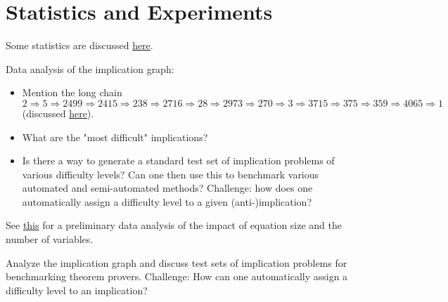 \section{Statistics and Experiments}


Some statistics are discussed \href{https://leanprover.zulipchat.com/#narrow/channel/458659-Equational/topic/A.20final.20end-to-end.20theorem.20in.20Lean}{here}.

Data analysis of the implication graph:

\begin{itemize}
    \item Mention the long chain $2 \Rightarrow 5 \Rightarrow 2499 \Rightarrow 2415 \Rightarrow 238 \Rightarrow 2716 \Rightarrow 28 \Rightarrow 2973 \Rightarrow 270 \Rightarrow 3 \Rightarrow 3715 \Rightarrow 375 \Rightarrow 359 \Rightarrow 4065 \Rightarrow 1$ (discussed \href{https://leanprover.zulipchat.com/#narrow/stream/458659-Equational/topic/visualization.20of.20graph.20closure}{here}).
    \item What are the "most difficult" implications?
    \item Is there a way to generate a standard test set of implication problems of various difficulty levels? Can one then use this to benchmark various automated and semi-automated methods? Challenge: how does one automatically assign a difficulty level to a given (anti-)implication?
\end{itemize}


See \href{https://leanprover.zulipchat.com/#narrow/channel/458659-Equational/topic/Outlier.20hunting}{this} for a preliminary data analysis of the impact of equation size and the number of variables.

Analyze the implication graph and discuss test sets of implication problems for benchmarking theorem provers. Challenge: How can one automatically assign a difficulty level to an implication?
